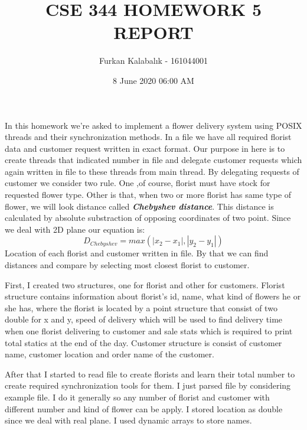 \documentclass[twocolumn]{article}
\title{CSE 344 HOMEWORK 5 REPORT}
\author{Furkan Kalabalık - 161044001}
\affil{Gebze Technical University\\
	Computer Science and Engineering Department}
\date{8 June 2020 06:00 AM}
\begin{document}
\maketitle        

\renewcommand{\abstractname}{Introduction}

In this homework we're asked to implement a flower delivery system using POSIX threads and their synchronization methods. In a file we have all required florist data and customer request written in exact format. Our purpose in here is to create threads that indicated number in file and delegate customer requests which again written in file to these threads from main thread. By delegating requests of customer we consider two rule. One ,of course, florist must have stock for requested flower type. Other is that, when two or more florist has same type of flower, we will look distance called \textbf{\textit{Chebyshev distance}}. This distance is calculated by absolute substraction of opposing coordinates of two point. Since we deal with 2D plane our equation is:
$$D_{Chebyshev} = max(|x_2 - x_1|, |y_2 - y_1|)$$Location of each florist and customer written in file. By that we can find distances and compare by selecting most closest florist to customer. 

First, I created two structures, one for florist and other for customers. Florist structure contains information about florist's id, name, what kind of flowers he or she has, where the florist is located by a point structure that consist of two double for x and y, speed of delivery which will be used to find delivery time when one florist delivering to customer and sale stats which is required to print total statics at the end of the day. Customer structure is consist of customer name, customer location and order name of the customer.

After that I started to read file to create florists and learn their total number to create required synchronization tools for them. I just parsed file by considering example file. I do it generally so any number of florist and customer with different number and kind of flower can be apply. I stored location as double since we deal with real plane. I used dynamic arrays to store names. 
\end{document}
